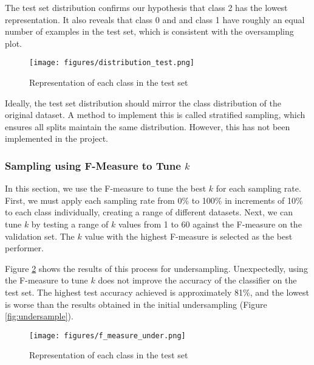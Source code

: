 \documentclass{article}
\theoremstyle{plain}
\theoremstyle{definition}
\theoremstyle{remark}
\begin{document}
        The test set distribution confirms our hypothesis that class 2 has the lowest representation. It also reveals that class 0 and and class 1 have roughly an equal number of examples in the test set, which is consistent with the oversampling plot.

        \begin{figure}[h]
            \centering
            \begin{minipage}[t]{0.8\linewidth}
                \centering
                \texttt{[image: figures/distribution\_test.png]}
                \caption{Representation of each class in the test set}
                \label{fig:test_dist}
            \end{minipage}%
        \end{figure}

        Ideally, the test set distribution should mirror the class distribution of the original dataset. A method to implement this is called stratified sampling, which ensures all splits maintain the same distribution. However, this has not been implemented in the project.

    \subsubsection{Sampling using F-Measure to Tune $k$}
        In this section, we use the F-measure to tune the best $k$ for each sampling rate. First, we must apply each sampling rate from 0\% to 100\% in increments of 10\% to each class individually, creating a range of different datasets. Next, we can tune $k$ by testing a range of $k$ values from 1 to 60 against the F-measure on the validation set. The $k$ value with the highest F-measure is selected as the best performer.

        Figure \ref{fig:f_under} shows the results of this process for undersampling. Unexpectedly, using the F-measure to tune $k$ does not improve the accuracy of the classifier on the test set. The highest test accuracy achieved is approximately 81\%, and the lowest is worse than the results obtained in the initial undersampling (Figure \ref{fig:undersample}).

        \begin{figure}[h]
            \centering
            \begin{minipage}[t]{0.8\linewidth}
                \centering
                \texttt{[image: figures/f\_measure\_under.png]}
                \caption{Representation of each class in the test set}
                \label{fig:f_under}
            \end{minipage}%
        \end{figure}
\end{document}
